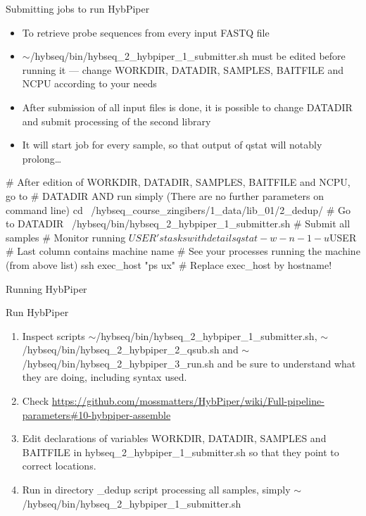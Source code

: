 \documentclass[compress,  xelatex, 11pt, xcolor=x11names, aspectratio=169,
	hyperref={
		bookmarks=true,
		unicode=true,
		colorlinks=true,
		pdftitle={HybSeq course},
		plainpages=false,
		pdfauthor={Vojtech Zeisek},
		pdfsubject={Practical processing of HybSeq target enrichment sequencing data on computing grids like MetaCentrum},
		pdfcreator={XeLaTeX},
		pdfkeywords={BASH, command line, GNU, HybSeq, Linux, MetaCentrum, sequencing shell, target enrichment},
		linkcolor=Turquoise4, %
		anchorcolor=DodgerBlue4, %
		citecolor=DodgerBlue4, %
		filecolor=DodgerBlue4, %
		menucolor=Tan4, %
		urlcolor=DarkOliveGreen4 %
		},
	url={hyphens, lowtilde} %
	]{beamer}
\renewcommand{\texttt}[1]{\colorbox{Cornsilk2}{{\ttfamily #1}}}
\renewcommand{\alert}[1]{\textcolor{OrangeRed3}{#1}}
\begin{document}
\begin{frame}[fragile]{Submitting jobs to run HybPiper}
	\begin{itemize}
		\item To retrieve probe sequences from every input FASTQ file
		\item \alert{\texttt{$\sim$/hybseq/bin/hybseq\_2\_hybpiper\_1\_submitter.sh} must be edited before running it --- change \texttt{WORKDIR}, \texttt{DATADIR}, \texttt{SAMPLES}, \texttt{BAITFILE} and \texttt{NCPU}} according to your needs
		\item After submission of all input files is done, it is possible to change \texttt{DATADIR} and submit processing of the second library
		\item It will start job for every sample, so that output of \texttt{qstat} will notably prolong\ldots
	\end{itemize}
	\begin{bashcode}
    # After edition of WORKDIR, DATADIR, SAMPLES, BAITFILE and NCPU, go to
    # DATADIR AND run simply (There are no further parameters on command line)
    cd ~/hybseq_course_zingibers/1_data/lib_01/2_dedup/ # Go to DATADIR
    ~/hybseq/bin/hybseq_2_hybpiper_1_submitter.sh # Submit all samples
    # Monitor running $USER's tasks with details
    qstat -w -n -1 -u $USER # Last column contains machine name
    # See your processes running the machine (from above list)
    ssh exec_host "ps ux" # Replace exec_host by hostname!
	\end{bashcode}
\end{frame}

\begin{frame}{Running HybPiper}
	\begin{exampleblock}{Run HybPiper}
		\begin{enumerate}
			\item Inspect scripts \texttt{$\sim$/hybseq/bin/hybseq\_2\_hybpiper\_1\_submitter.sh}, \texttt{$\sim$/hybseq/bin/hybseq\_2\_hybpiper\_2\_qsub.sh} and \texttt{$\sim$/hybseq/bin/hybseq\_2\_hybpiper\_3\_run.sh} and be sure to understand what they are doing, including syntax used.
			\item Check \url{https://github.com/mossmatters/HybPiper/wiki/Full-pipeline-parameters\#10-hybpiper-assemble}
			\item Edit declarations of variables \texttt{WORKDIR}, \texttt{DATADIR}, \texttt{SAMPLES} and \texttt{BAITFILE} in \texttt{hybseq\_2\_hybpiper\_1\_submitter.sh} so that they point to correct locations.
			\item Run in directory \texttt{2\_dedup} script processing all samples, simply \texttt{$\sim$/hybseq/bin/hybseq\_2\_hybpiper\_1\_submitter.sh}
		\end{enumerate}
	\end{exampleblock}
\end{frame}
\end{document}
